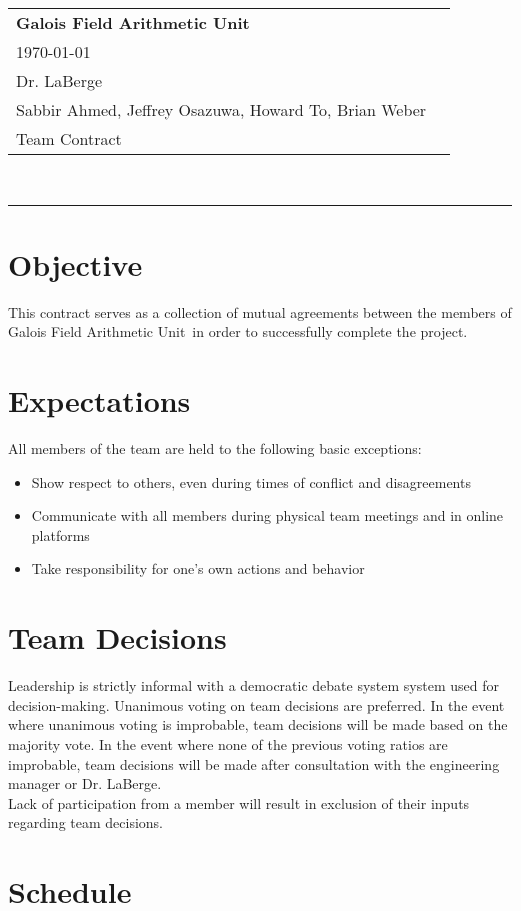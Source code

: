 \documentclass[paper=usletter, fontsize=12pt]{article}
\newcommand{\team}{Galois Field Arithmetic Unit}
\newcommand{\Sabbir}{Sabbir Ahmed}
\newcommand{\Jeffrey}{Jeffrey Osazuwa}
\newcommand{\Howard}{Howard To}
\newcommand{\Brian}{Brian Weber}
\newcommand{\documentinfo}[5]{
    \begin{centering}
        \parbox{6.8in}{
        \begin{spacing}{1}
            \begin{flushleft}
                \begin{tabular}{l l}
                    \large\textbf{#1} \\
                    #2 \\
                    #3 \\
                    #4 \\
                    #5 \\
                \end{tabular}\\
                \rule{\textwidth}{1pt}
            \end{flushleft}
        \end{spacing}
        }
    \end{centering}
}
\begin{document}
\documentinfo{\team~}{\today}{Dr. LaBerge}{\Sabbir, \Jeffrey, \Howard, \Brian}{Team Contract}

    \vspace{-0.3in}
    \section{Objective}

        This contract serves as a collection of mutual agreements between the members of \team \ in order to successfully complete the project.

    \section{Expectations}

        All members of the team are held to the following basic exceptions:

        \begin{itemize}

            \item Show respect to others, even during times of conflict and disagreements
            \item Communicate with all members during physical team meetings and in online platforms
            \item Take responsibility for one’s own actions and behavior

        \end{itemize}

    \section{Team Decisions}

        Leadership is strictly informal with a democratic debate system system used for decision-making. Unanimous voting on team decisions are preferred. In the event where unanimous voting is improbable, team decisions will be made based on the majority vote. In the event where none of the previous voting ratios are improbable, team decisions will be made after consultation with the engineering manager or Dr. LaBerge. \\

        Lack of participation from a member will result in exclusion of their inputs regarding team decisions. 

    \section{Schedule}
\end{document}
